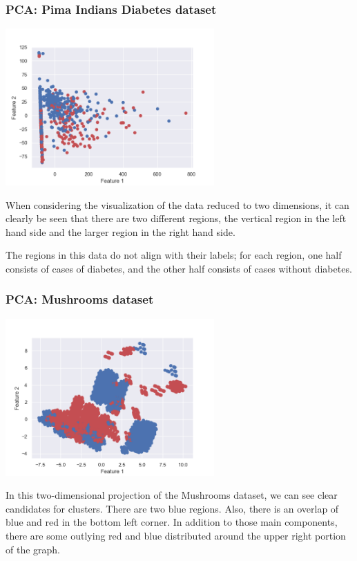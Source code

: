 \documentclass[11pt]{article}
\begin{document}
            \subsubsection{PCA: Pima Indians Diabetes dataset}

            \includegraphics[width=8cm]{../pima/pca/diabetes_pca.png}

            When considering the visualization of the data reduced to two dimensions,
            it can clearly be seen that there are two different regions, the vertical
            region in the left hand side and the larger region in the right hand side.

            The regions in this data do not align with their labels; for each region,
            one half consists of cases of diabetes, and the other half consists of cases
            without diabetes.

            \subsubsection{PCA: Mushrooms dataset}

            \includegraphics[width=8cm]{../mushrooms/pca/mushrooms_pca.png}

            In this two-dimensional projection of the Mushrooms dataset, we can see clear candidates for clusters.
            There are two blue regions. Also, there is an overlap of blue and red in the bottom left corner. In addition
            to those main components, there are some outlying red and blue distributed around the upper right portion
            of the graph.
\end{document}
